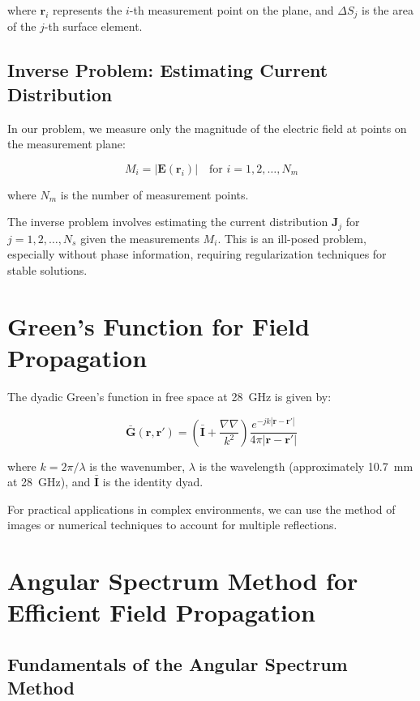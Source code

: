 \documentclass[12pt,a4paper]{article}
\begin{document}
where $\mathbf{r}_i$ represents the $i$-th measurement point on the plane, and $\Delta S_j$ is the area of the $j$-th surface element.

\subsection{Inverse Problem: Estimating Current Distribution}

In our problem, we measure only the magnitude of the electric field at points on the measurement plane:

\begin{equation}
    M_i = |\mathbf{E}(\mathbf{r}_i)| \quad \text{for } i = 1, 2, \ldots, N_m
\end{equation}

where $N_m$ is the number of measurement points.

The inverse problem involves estimating the current distribution $\mathbf{J}_j$ for $j = 1, 2, \ldots, N_s$ given the measurements $M_i$. This is an ill-posed problem, especially without phase information, requiring regularization techniques for stable solutions.

\section{Green's Function for Field Propagation}

The dyadic Green's function in free space at \SI{28}{\giga\hertz} is given by:

\begin{equation}
    \bar{\mathbf{G}}(\mathbf{r}, \mathbf{r}') = \left(\bar{\mathbf{I}} + \frac{\nabla\nabla}{k^2}\right) \frac{e^{-jk|\mathbf{r} - \mathbf{r}'|}}{4\pi|\mathbf{r} - \mathbf{r}'|}
\end{equation}

where $k = 2\pi/\lambda$ is the wavenumber, $\lambda$ is the wavelength (approximately \SI{10.7}{\milli\meter} at \SI{28}{\giga\hertz}), and $\bar{\mathbf{I}}$ is the identity dyad.

For practical applications in complex environments, we can use the method of images or numerical techniques to account for multiple reflections.

\section{Angular Spectrum Method for Efficient Field Propagation}

\subsection{Fundamentals of the Angular Spectrum Method}
\end{document}
